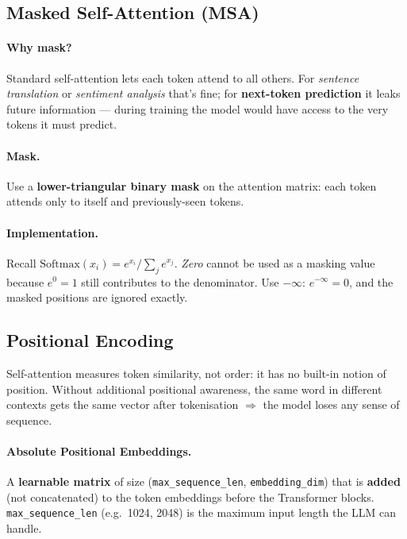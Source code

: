 \documentclass[11pt,a4paper]{article}
\theoremstyle{definition}
\theoremstyle{plain}
\theoremstyle{remark}
\begin{document}
\subsection{Masked Self-Attention (MSA)}

\paragraph{Why mask?} Standard self-attention lets each token attend to all others. For \emph{sentence translation} or \emph{sentiment analysis} that's fine; for \textbf{next-token prediction} it leaks future information --- during training the model would have access to the very tokens it must predict.

\paragraph{Mask.} Use a \textbf{lower-triangular binary mask} on the attention matrix: each token attends only to itself and previously-seen tokens.

\paragraph{Implementation.} Recall $\mathrm{Softmax}(x_i) = e^{x_i} / \sum_j e^{x_j}$. \emph{Zero} cannot be used as a masking value because $e^0 = 1$ still contributes to the denominator. Use \textbf{$-\infty$}: $e^{-\infty} = 0$, and the masked positions are ignored exactly.

\subsection{Positional Encoding}

Self-attention measures token similarity, not order: it has no built-in notion of position. Without additional positional awareness, the same word in different contexts gets the same vector after tokenisation $\Rightarrow$ the model loses any sense of sequence.

\paragraph{Absolute Positional Embeddings.} A \textbf{learnable matrix} of size (\texttt{max\_sequence\_len}, \texttt{embedding\_dim}) that is \textbf{added} (not concatenated) to the token embeddings before the Transformer blocks. \texttt{max\_sequence\_len} (e.g.\ 1024, 2048) is the maximum input length the LLM can handle.
\end{document}
